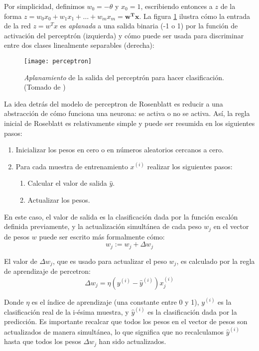 Por simplicidad, definimos $w_0=-\theta$ y $x_0=1$, escribiendo entonces a $z$ de la
forma $z=w_0x_0 + w_1x_1 + \dots + w_mx_m = \mathbf{w^Tx}$.
La figura \ref{fig:binary} ilustra cómo la entrada de la red $z=w^Tx$ es \textit{aplanada}
a una salida binaria (-1 o 1) por la función de activación del perceptrón (izquierda)
y cómo puede ser usada para discriminar entre dos clases linealmente separables (derecha):
\begin{figure}[H]
  \texttt{[image: perceptron]}
  \centering
  \caption{\textit{Aplanamiento} de la salida del perceptrón para hacer clasificación.
  (Tomado de \cite{python})}
  \label{fig:binary}
\end{figure}

La idea detrás del modelo de perceptron de Rosenblatt es reducir a una abstracción de cómo funciona
una neurona: se activa o no se activa. Así, la regla inicial de Roseblatt es relativamente
simple y puede ser resumida en los siguientes pasos:
\begin{enumerate}
  \item Inicializar los pesos en cero o en números aleatorios cercanos a cero.
  \item Para cada muestra de entrenamiento $x^{(i)}$ realizar los siguientes pasos:
  \begin{enumerate}
    \item Calcular el valor de salida $\hat y$.
    \item Actualizar los pesos.
  \end{enumerate}
\end{enumerate}


En este caso, el valor de salida es la clasificación dada por la función escalón
definida previamente, y la actualización simultánea de cada peso $w_j$ en el
vector de pesos $w$ puede ser escrito más formalmente cómo:
\begin{equation}
  w_j := w_j + \Delta w_j
\end{equation}

El valor de $\Delta w_j$, que es usado para actualizar el peso $w_j$, es
calculado por la regla de aprendizaje de percetron:
\begin{equation}
  \Delta w_j = \eta (y^{(i)} - \hat y^{(i)})x^{(i)}_j
\end{equation}

Donde $\eta$ es el índice de aprendizaje (una constante entre 0 y 1),
$y^{(i)}$ es la clasificación real de la i-ésima muestra, y $\hat y^{(i)}$
es la clasificación dada por la predicción. Es importante recalcar que
todos los pesos en el vector de pesos son actualizados de manera
simultánea, lo que significa que no recalculamos $\hat y^{(i)}$ hasta que
todos los pesos $\Delta w_j$ han sido actualizados.

